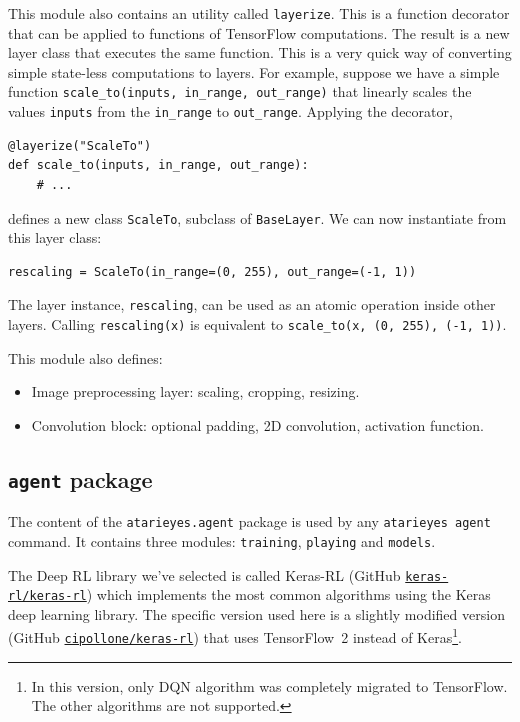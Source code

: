 This module also contains an utility called \texttt{layerize}. This is a
function decorator that can be applied to functions of TensorFlow
computations. The result is a new layer class that executes the same function.
This is a very quick way of converting simple state-less computations to
layers. For example, suppose we have a simple function
\lstinline[style=inlinepy]|scale_to(inputs, in_range, out_range)| that
linearly scales the values \texttt{inputs} from the \verb|in_range| to
\verb|out_range|. Applying the decorator,
\begin{lstlisting}[style=python]
@layerize("ScaleTo")
def scale_to(inputs, in_range, out_range):
	# ...
\end{lstlisting}
defines a new class \texttt{ScaleTo}, subclass of \texttt{BaseLayer}. We can
now instantiate from this layer class:
\begin{lstlisting}[style=python]
	rescaling = ScaleTo(in_range=(0, 255), out_range=(-1, 1))
\end{lstlisting}
The layer instance, \texttt{rescaling}, can be used as an atomic operation
inside other layers. Calling \lstinline[style=inlinepy]|rescaling(x)| is
equivalent to \lstinline[style=inlinepy]|scale_to(x, (0, 255), (-1, 1))|.

This module also defines:
\begin{itemize}
	\item Image preprocessing layer: scaling, cropping, resizing.
	\item Convolution block: optional padding, 2D convolution, activation
		function.
\end{itemize}

\subsection{\texttt{agent} package}

\label{sec:impl-agent}

The content of the \verb|atarieyes.agent| package is used by any
\verb|atarieyes agent| command. It contains three modules: \texttt{training},
\texttt{playing} and \texttt{models}.

The Deep RL library we've selected is called Keras-RL (GitHub
\href{https://github.com/keras-rl/keras-rl}{\texttt{keras-rl/keras-rl}})
which implements the most common algorithms using the Keras deep learning
library. The specific version used here is a slightly modified version (GitHub
\href{https://github.com/cipollone/keras-rl}{\texttt{cipollone/keras-rl}})
that uses TensorFlow~2 instead of Keras\footnote{In this version, only DQN
algorithm was completely migrated to TensorFlow. The other algorithms are not
supported.}.



